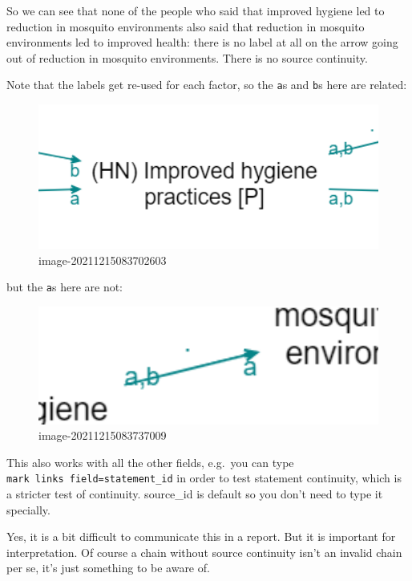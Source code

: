 \documentclass[
]{book}
\begin{document}
So we can see that none of the people who said that improved hygiene led to reduction in mosquito environments also said that reduction in mosquito environments led to improved health: there is no label at all on the arrow going out of reduction in mosquito environments. There is no source continuity.

Note that the labels get re-used for each factor, so the \texttt{a}s and \texttt{b}s here are related:

\begin{figure}
\centering
\includegraphics[width=6.77083in,height=\textheight]{_assets/image-20211215083702603.png}
\caption{image-20211215083702603}
\end{figure}

but the \texttt{a}s here are not:

\begin{figure}
\centering
\includegraphics[width=6.77083in,height=\textheight]{_assets/image-20211215083737009.png}
\caption{image-20211215083737009}
\end{figure}

This also works with all the other fields, e.g.~you can type \texttt{mark\ links\ field=statement\_id} in order to test statement continuity, which is a stricter test of continuity. source\_id is default so you don't need to type it specially.

Yes, it is a bit difficult to communicate this in a report. But it is important for interpretation. Of course a chain without source continuity isn't an invalid chain per se, it's just something to be aware of.
\end{document}
